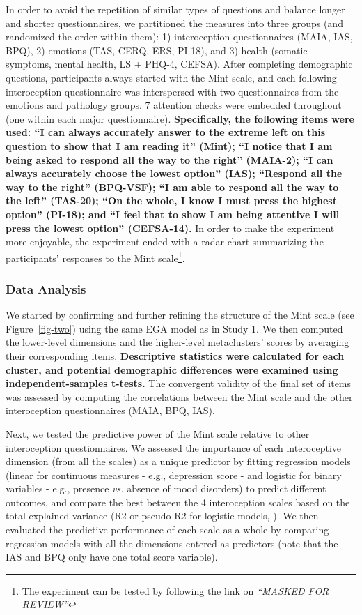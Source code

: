 \documentclass[
  man,
  floatsintext,
  longtable,
  nolmodern,
  notxfonts,
  notimes,
  mask,
  colorlinks=true,linkcolor=blue,citecolor=blue,urlcolor=blue]{apa7}
\begin{document}
In order to avoid the repetition of similar types of questions and
balance longer and shorter questionnaires, we partitioned the measures
into three groups (and randomized the order within them): 1)
interoception questionnaires (MAIA, IAS, BPQ), 2) emotions (TAS, CERQ,
ERS, PI-18), and 3) health (somatic symptoms, mental health, LS + PHQ-4,
CEFSA). After completing demographic questions, participants always
started with the Mint scale, and each following interoception
questionnaire was interspersed with two questionnaires from the emotions
and pathology groups. 7 attention checks were embedded throughout (one
within each major questionnaire). \textbf{Specifically, the following
items were used: ``I can always accurately answer to the extreme left on
this question to show that I am reading it'' (Mint); ``I notice that I
am being asked to respond all the way to the right'' (MAIA-2); ``I can
always accurately choose the lowest option'' (IAS); ``Respond all the
way to the right'' (BPQ-VSF); ``I am able to respond all the way to the
left'' (TAS-20); ``On the whole, I know I must press the highest
option'' (PI-18); and ``I feel that to show I am being attentive I will
press the lowest option'' (CEFSA-14).} In order to make the experiment
more enjoyable, the experiment ended with a radar chart summarizing the
participants' responses to the Mint scale\footnote{The experiment can be
  tested by following the link on \emph{``MASKED FOR REVIEW''}}.

\subsubsection{Data Analysis}\label{data-analysis-1}

We started by confirming and further refining the structure of the Mint
scale (see Figure~\ref{fig-two}) using the same EGA model as in Study 1.
We then computed the lower-level dimensions and the higher-level
metaclusters' scores by averaging their corresponding items.
\textbf{Descriptive statistics were calculated for each cluster, and
potential demographic differences were examined using
independent-samples t-tests.} The convergent validity of the final set
of items was assessed by computing the correlations between the Mint
scale and the other interoception questionnaires (MAIA, BPQ, IAS).

Next, we tested the predictive power of the Mint scale relative to other
interoception questionnaires. We assessed the importance of each
interoceptive dimension (from all the scales) as a unique predictor by
fitting regression models (linear for continuous measures - e.g.,
depression score - and logistic for binary variables - e.g., presence
\emph{vs.} absence of mood disorders) to predict different outcomes, and
compare the best between the 4 interoception scales based on the total
explained variance (R2 or pseudo-R2 for logistic models,
). We then
evaluated the predictive performance of each scale as a whole by
comparing regression models with all the dimensions entered as
predictors (note that the IAS and BPQ only have one total score
variable).
\end{document}
